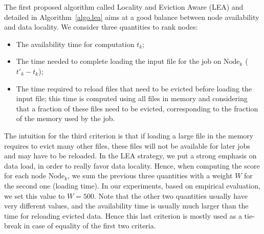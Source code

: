 \documentclass[conference,10pt]{IEEEtran}
\newcommand{\Node}[1]{\ensuremath{\mathrm{Node}_{#1}}\xspace}
\begin{document}
The first proposed algorithm called Locality and Eviction Aware (LEA)
and detailed in Algorithm~\ref{algo.lea} aims at a good balance
between node availability and data locality.  We consider three
quantities to rank nodes:
\begin{itemize}
\item The availability time for computation $t_k$;
\item The time needed to complete loading the input file for the job
  on \Node{k} ($t'_k - t_k$);
\item The time required to reload files that need to be evicted before
  loading the input file; this time is computed using all files in
  memory and considering that a fraction of these files need to be
  evicted, corresponding to the fraction of the memory used by the job.
\end{itemize}

The intuition for the third criterion is that if loading a large file
in the memory requires to evict many other files, these files will not
be available for later jobs and may have to be reloaded.
In the LEA strategy, we put a strong emphasis on data load, in order
to really favor data locality. Hence, when computing the score for
each node \Node{k}, we sum the previous three quantities with a weight
$W$ for the second one (loading time). In our experiments, based on
empirical evaluation, we  set this value to $W=500$.
Note that the other two quantities usually have very different values,
and the availability time is usually much larger than the time for
reloading evicted data. Hence this last criterion is mostly used as a
tie-break in case of equality of the first two criteria.
\end{document}
